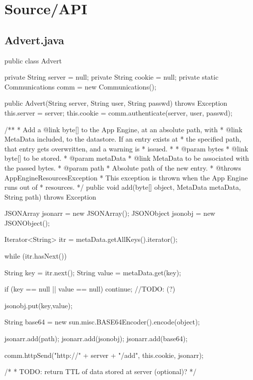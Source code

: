 \section{Source/API}
\subsection{Advert.java}
\begin{code}
public class Advert {
	
	private String server       = null;
	private String cookie       = null;
	private static Communications comm = new Communications();
	
	public Advert(String server, String user, String passwd) 
	  throws Exception {
		this.server = server;
		this.cookie = comm.authenticate(server, user, passwd);
	}
	
	/**
	 * Add a {@link byte}[] to the App Engine, at an absolute path, with
	 * {@link MetaData} included, to the datastore. If an entry exists at 
	 * the specified path, that entry gets overwritten, and a warning is 
	 * issued.
	 * 
	 * @param bytes
	 *     {@link byte}[] to be stored.
	 * @param metaData
	 *     {@link MetaData} to be associated with the passed bytes.
	 * @param path
	 *     Absolute path of the new entry.
	 * @throws AppEngineResourcesException
	 *     This exception is thrown when the App Engine runs out of
	 *     resources.
	 */
	public void add(byte[] object, MetaData metaData, String path) 
	  throws Exception {
		JSONArray  jsonarr = new JSONArray();
		JSONObject jsonobj = new JSONObject();

		Iterator<String> itr  = metaData.getAllKeys().iterator();
	
		while (itr.hasNext()) {
			String key = itr.next();
			String value = metaData.get(key);

			if (key == null || value == null) {
				continue; //TODO: (?)
			}
			
			jsonobj.put(key,value);
		}
		
		String base64 = new sun.misc.BASE64Encoder().encode(object);
		
		jsonarr.add(path);
		jsonarr.add(jsonobj);
		jsonarr.add(base64);
		
		comm.httpSend("http://" + server + "/add", this.cookie, 
			jsonarr);
		
        /*
         * TODO: return TTL of data stored at server (optional)?
         */
	}
}
\end{code}

